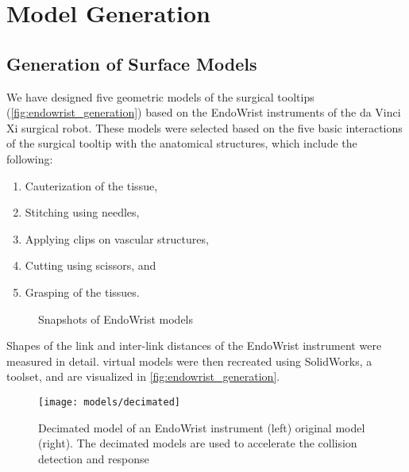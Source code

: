 
\section{Model Generation}
\label{sec:generation_3d}

\subsection{Generation of Surface Models}
\label{ssec:generation_surface}

We have designed five geometric models of the surgical tooltips (\autoref{fig:endowrist_generation}) based on the EndoWrist instruments of the da Vinci Xi surgical robot. These models were selected based on the five basic interactions of the surgical tooltip with the anatomical structures, which include the following:
\begin{enumerate}
  \item Cauterization of the tissue,
  \item Stitching using needles,
  \item Applying clips on vascular structures,
  \item Cutting using scissors, and
  \item Grasping of the tissues.
\end{enumerate}

\begin{figure}
  \centering%
  \caption{Snapshots of EndoWrist   models}
  \label{fig:endowrist_generation}
\end{figure}

Shapes of the link and inter-link distances of the EndoWrist instrument were measured in detail.  virtual models were then recreated using SolidWorks, a  toolset, and are visualized in \autoref{fig:endowrist_generation}.

\begin{figure}
  \centering%
  \texttt{[image: models/decimated]}
  \caption{Decimated model of an EndoWrist instrument (left) \vs original model (right). The decimated models are used to accelerate the collision detection and response}
  \label{fig:decimated}
\end{figure}

